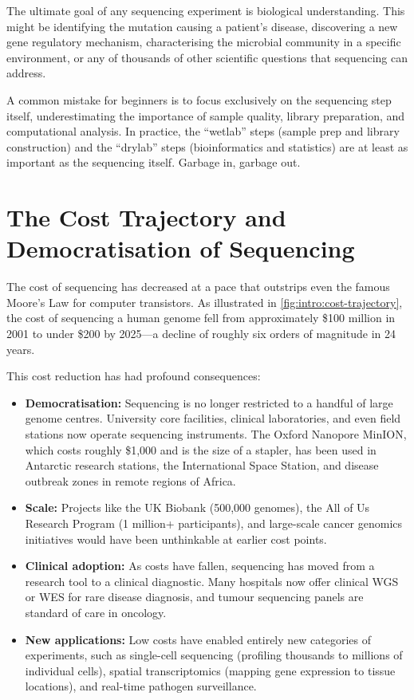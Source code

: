The ultimate goal of any sequencing experiment is biological understanding. This might be identifying the mutation causing a patient's disease, discovering a new gene regulatory mechanism, characterising the microbial community in a specific environment, or any of thousands of other scientific questions that sequencing can address.

\begin{tipbox}
A common mistake for beginners is to focus exclusively on the sequencing step itself, underestimating the importance of sample quality, library preparation, and computational analysis. In practice, the ``wetlab'' steps (sample prep and library construction) and the ``drylab'' steps (bioinformatics and statistics) are at least as important as the sequencing itself. Garbage in, garbage out.
\end{tipbox}


\section{The Cost Trajectory and Democratisation of Sequencing}
\label{sec:intro:cost}

The cost of sequencing has decreased at a pace that outstrips even the famous Moore's Law for computer transistors. As illustrated in \cref{fig:intro:cost-trajectory}, the cost of sequencing a human genome fell from approximately \$100 million in 2001 to under \$200 by 2025---a decline of roughly six orders of magnitude in 24 years.

This cost reduction has had profound consequences:

\begin{itemize}[itemsep=3pt]
  \item \textbf{Democratisation:} Sequencing is no longer restricted to a handful of large genome centres. University core facilities, clinical laboratories, and even field stations now operate sequencing instruments. The Oxford Nanopore MinION, which costs roughly \$1,000 and is the size of a stapler, has been used in Antarctic research stations, the International Space Station, and disease outbreak zones in remote regions of Africa.

  \item \textbf{Scale:} Projects like the UK Biobank (500,000 genomes), the All of Us Research Program (1 million+ participants), and large-scale cancer genomics initiatives would have been unthinkable at earlier cost points.

  \item \textbf{Clinical adoption:} As costs have fallen, sequencing has moved from a research tool to a clinical diagnostic. Many hospitals now offer clinical \acrshort{WGS} or \acrshort{WES} for rare disease diagnosis, and tumour sequencing panels are standard of care in oncology.

  \item \textbf{New applications:} Low costs have enabled entirely new categories of experiments, such as single-cell sequencing (profiling thousands to millions of individual cells), spatial transcriptomics (mapping gene expression to tissue locations), and real-time pathogen surveillance.
\end{itemize}

